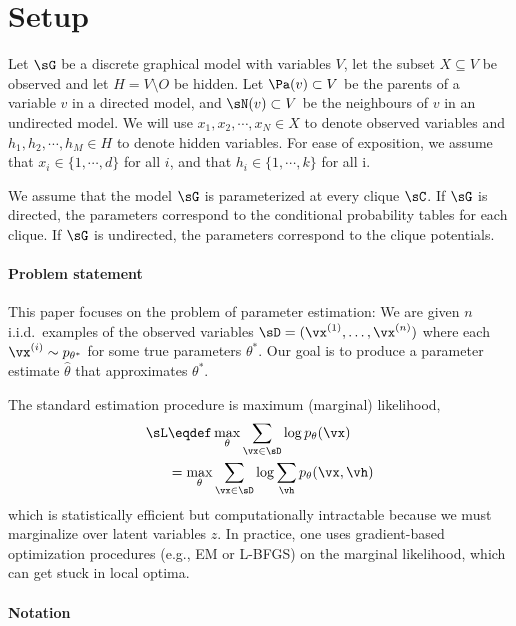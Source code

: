 \section{Setup}
\label{sec:setup}

Let $\sG$ be a discrete graphical model with variables $V$, 
  let the subset $X \subseteq V$ be observed and 
  let $H = V \setminus O$ be hidden.
Let $\Pa(v) \subset V$ be the parents of a variable $v$ in a directed
  model, and $\sN(v) \subset V$ be the neighbours of $v$ in an undirected
  model.
We will use $x_1, x_2, \cdots, x_N \in X$ to denote observed variables and
  $h_1, h_2, \cdots, h_M \in H$ to denote hidden variables.
For ease of exposition, we assume that $x_i \in \{1, \cdots, d\}$ for
  all $i$, and that $h_i \in \{1, \cdots, k\}$ for all i.

We assume that the model $\sG$ is parameterized at every clique $\sC$.
If $\sG$ is directed, the parameters correspond to
  the conditional probability tables for each clique.
If $\sG$ is undirected, the parameters correspond to the clique
  potentials.

\paragraph{Problem statement}

This paper focuses on the problem of parameter estimation:
We are given $n$ i.i.d.~examples of the observed variables $\sD
  = (\vx^{(1)}, \dots, \vx^{(n)})$ where each $\vx^{(i)} \sim p_{\theta^*}$ for
  some true parameters $\theta^*$.
Our goal is to produce a parameter estimate $\hat\theta$ that
  approximates $\theta^*$.

The standard estimation procedure is maximum (marginal) likelihood,
  \begin{align*}
    \sL &\eqdef \max_{\theta} \sum_{\vx \in \sD} \log p_\theta(\vx) \\
        &=      \max_{\theta} \sum_{\vx \in \sD} \log \sum_{\vh} p_\theta(\vx,\vh)
  \end{align*}
  which is statistically efficient but computationally intractable
  because we must marginalize over latent variables $z$.
In practice, one uses gradient-based optimization procedures (e.g., EM
  or L-BFGS) on the marginal likelihood, which can get stuck in local
  optima.

\paragraph{Notation}

